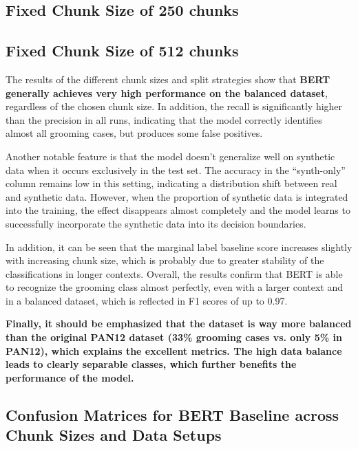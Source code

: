 


\subsection{Fixed Chunk Size of 250 chunks}



\subsection{Fixed Chunk Size of 512 chunks}



The results of the different chunk sizes and split strategies show that \textbf{BERT generally achieves very high performance on the balanced dataset}, regardless of the chosen chunk size. In addition, the recall is significantly higher than the precision in all runs, indicating that the model correctly identifies almost all grooming cases, but produces some false positives. 

Another notable feature is that the model doesn't generalize well on synthetic data when it occurs exclusively in the test set. The accuracy in the “synth-only” column remains low in this setting, indicating a distribution shift between real and synthetic data. However, when the proportion of synthetic data is integrated into the training, the effect disappears almost completely and the model learns to successfully incorporate the synthetic data into its decision boundaries.

In addition, it can be seen that the marginal label baseline score increases slightly with increasing chunk size, which is probably due to greater stability of the classifications in longer contexts. Overall, the results confirm that BERT is able to recognize the grooming class almost perfectly, even with a larger context and in a balanced dataset, which is reflected in F1 scores of up to 0.97.

\textbf{Finally, it should be emphasized that the dataset is way more balanced than the original PAN12 dataset (33\% grooming cases vs. only 5\% in PAN12), which explains the excellent metrics. The high data balance leads to clearly separable classes, which further benefits the performance of the model.}


\subsection{Confusion Matrices for BERT Baseline across Chunk Sizes and Data Setups}

